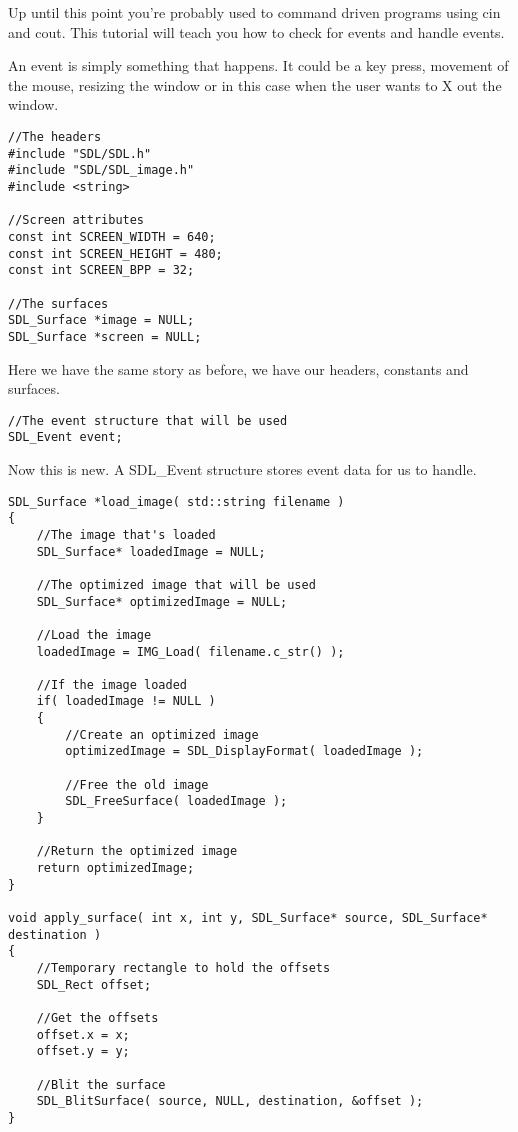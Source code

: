 
Up until this point you're probably used to command driven programs using cin
and cout. This tutorial will teach you how to check for events and handle
events.

An event is simply something that happens. It could be a key press, movement of
the mouse, resizing the window or in this case when the user wants to X out the
window.

\begin{verbatim}
//The headers
#include "SDL/SDL.h"
#include "SDL/SDL_image.h"
#include <string>

//Screen attributes
const int SCREEN_WIDTH = 640;
const int SCREEN_HEIGHT = 480;
const int SCREEN_BPP = 32;

//The surfaces
SDL_Surface *image = NULL;
SDL_Surface *screen = NULL;
\end{verbatim}

Here we have the same story as before, we have our headers, constants and
surfaces.

\begin{verbatim}
//The event structure that will be used
SDL_Event event;
\end{verbatim}

Now this is new. A SDL\_Event structure stores event data for us to handle.

\begin{verbatim}
SDL_Surface *load_image( std::string filename ) 
{
    //The image that's loaded
    SDL_Surface* loadedImage = NULL;
    
    //The optimized image that will be used
    SDL_Surface* optimizedImage = NULL;
    
    //Load the image
    loadedImage = IMG_Load( filename.c_str() );
    
    //If the image loaded
    if( loadedImage != NULL )
    {
        //Create an optimized image
        optimizedImage = SDL_DisplayFormat( loadedImage );
        
        //Free the old image
        SDL_FreeSurface( loadedImage );
    }
    
    //Return the optimized image
    return optimizedImage;
}

void apply_surface( int x, int y, SDL_Surface* source, SDL_Surface* destination )
{
    //Temporary rectangle to hold the offsets
    SDL_Rect offset;
    
    //Get the offsets
    offset.x = x;
    offset.y = y;
    
    //Blit the surface
    SDL_BlitSurface( source, NULL, destination, &offset );
}
\end{verbatim}

